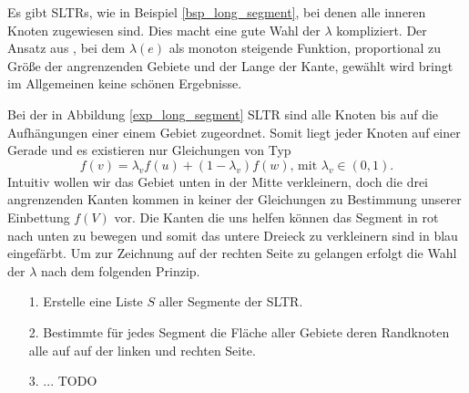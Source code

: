 Es gibt SLTRs, wie in Beispiel \ref{bsp_long_segment}, bei denen alle inneren Knoten zugewiesen sind. Dies macht eine gute Wahl der $\lambda$ kompliziert. Der Ansatz aus \cite{fs17}, bei dem $\lambda(e)$ als monoton steigende Funktion, proportional zu Größe der angrenzenden Gebiete und der Lange der Kante, gewählt wird bringt im Allgemeinen keine schönen Ergebnisse.

\begin{example}\label{bsp_long_segment}
Bei der in Abbildung \ref{exp_long_segment} SLTR sind alle Knoten bis auf die Aufhängungen einer einem Gebiet zugeordnet. Somit liegt jeder Knoten auf einer Gerade und es existieren nur Gleichungen von Typ
$$ f(v) = \lambda_v f(u) + (1-\lambda_v)f(w) \text{, mit } \lambda_v \in (0,1).$$
Intuitiv wollen wir das Gebiet unten in der Mitte verkleinern, doch die drei angrenzenden Kanten kommen in keiner der Gleichungen zu Bestimmung unserer Einbettung $f(V)$ vor. Die Kanten die uns helfen können das Segment in rot nach unten zu bewegen und somit das untere Dreieck zu verkleinern sind in blau eingefärbt. Um zur Zeichnung auf der rechten Seite zu gelangen erfolgt die Wahl der $\lambda$ nach dem folgenden Prinzip.
\begin{itemize}
\item [1.] Erstelle eine Liste $S$ aller Segmente der SLTR.
\item [2.] Bestimmte für jedes Segment die Fläche aller Gebiete deren Randknoten alle auf auf der linken und rechten Seite.
\item [3.] ... TODO
\end{itemize}
\end{example}


